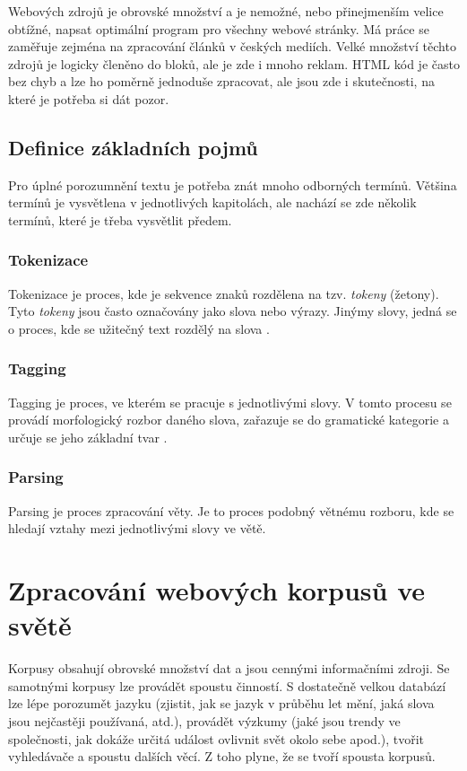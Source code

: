 Webových zdrojů je obrovské množství a je nemožné, nebo přinejmenším velice obtížné, napsat optimální program
pro všechny webové stránky. Má práce se zaměřuje zejména na zpracování článků v českých mediích. Velké množství těchto zdrojů
je logicky členěno do bloků, ale je zde i mnoho reklam. HTML kód je často bez chyb a lze ho poměrně jednoduše
zpracovat, ale jsou zde i skutečnosti, na které je potřeba si dát pozor.

\section{Definice základních pojmů}
Pro úplné porozumnění textu je potřeba znát mnoho odborných termínů. Většina termínů je vysvětlena
v jednotlivých kapitolách, ale nachází se zde několik termínů, které je třeba vysvětlit předem.

\subsection{Tokenizace}
\label{Tokenizace}
Tokenizace je proces, kde je sekvence znaků rozdělena na tzv. \textit{tokeny} (žetony). Tyto \textit{tokeny} jsou
často označovány jako slova nebo výrazy. Jinýmy slovy, jedná se o proces, kde se užitečný text rozdělý na slova \cite{TOKENIZACE}.

\subsection{Tagging}
\label{Tagging}
Tagging je proces, ve kterém se pracuje s jednotlivými slovy. V tomto procesu se provádí morfologický rozbor daného slova,
zařazuje se do gramatické kategorie a určuje se jeho základní tvar \cite{TAGGING}.

\subsection{Parsing}
\label{Parsing}
Parsing je proces zpracování věty. Je to proces podobný větnému rozboru, kde se hledají vztahy mezi jednotlivými slovy
ve větě.

\chapter{Zpracování webových korpusů ve světě}
Korpusy obsahují obrovské množství dat a jsou cennými informačními zdroji. Se samotnými korpusy
lze provádět spoustu činností. S dostatečně velkou databází lze lépe porozumět jazyku
(zjistit, jak se jazyk v průběhu let mění, jaká slova jsou nejčastěji používaná, atd.),
provádět výzkumy (jaké jsou trendy ve společnosti, jak dokáže určitá událost ovlivnit svět okolo sebe apod.),
tvořit vyhledávače a spoustu dalších věcí. Z toho plyne, že se tvoří spousta korpusů.

